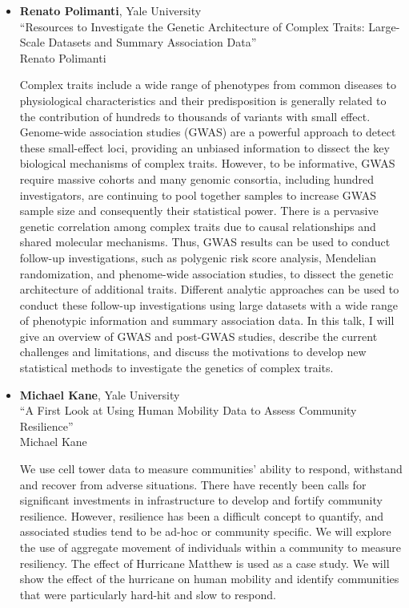 \begin{itemize}
\item \textbf{Renato Polimanti}, Yale University \\
``Resources to Investigate the Genetic Architecture of Complex Traits: Large-Scale  Datasets and Summary Association Data'' \\
Renato Polimanti


Complex traits include a wide range of phenotypes from common diseases to physiological characteristics and their predisposition is generally related to the contribution of hundreds to thousands of variants with small effect. Genome-wide association studies (GWAS) are a powerful approach to detect these small-effect loci, providing an unbiased information to dissect the key biological mechanisms of complex traits. However, to be informative, GWAS require massive cohorts and many genomic consortia, including hundred investigators, are continuing to pool together samples to increase GWAS sample size and consequently their statistical power. There is a pervasive genetic correlation among complex traits due to causal relationships and shared molecular mechanisms. Thus, GWAS results can be used to conduct follow-up investigations, such as polygenic risk score analysis, Mendelian randomization, and phenome-wide association studies, to dissect the genetic architecture of additional traits. Different analytic approaches can be used to conduct these follow-up investigations using large datasets with a wide range of phenotypic information and summary association data. In this talk, I will give an overview of GWAS and post-GWAS studies, describe the current challenges and limitations, and discuss the motivations to develop new statistical methods to investigate the genetics of complex traits.

\item \textbf{Michael Kane}, Yale University \\
``A First Look at Using Human Mobility Data to Assess Community Resilience'' \\
Michael Kane


We use cell tower data to measure communities' ability to respond, withstand and recover from adverse situations. There have recently been calls for significant investments in infrastructure to develop and fortify community resilience. However, resilience has been a difficult concept to quantify, and associated studies tend to be ad-hoc or community specific. We will explore the use of aggregate movement of individuals within a community to measure resiliency. The effect of Hurricane Matthew is used as a case study. We will show the effect of the hurricane on human mobility and identify communities that were particularly hard-hit and slow to respond.

\end{itemize}

